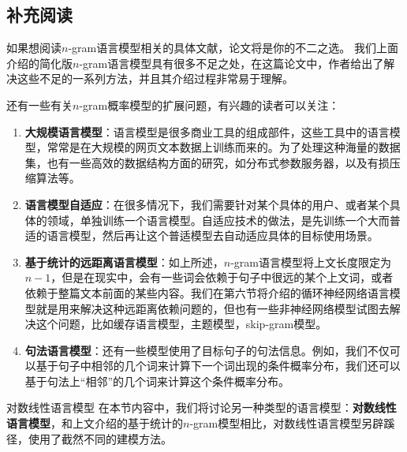 \documentclass[10pt,a4paper]{ctexart}
\makeatletter
\renewcommand{\section}{\@startsection{section}{1}{0mm}
  {-\baselineskip}{0.5\baselineskip}{\bf\leftline}}
\makeatother
\begin{document}
\subsection{补充阅读}
如果想阅读$n$-gram语言模型相关的具体文献，论文\cite{goodman2001bit}将是你的不二之选。
我们上面介绍的简化版$n$-gram语言模型具有很多不足之处，在这篇论文中，作者给出了解决这些不足的一系列方法，并且其介绍过程非常易于理解。

还有一些有关$n$-gram概率模型的扩展问题，有兴趣的读者可以关注：
\begin{enumerate}
\item[] \textbf{大规模语言模型}：语言模型是很多商业工具的组成部件，这些工具中的语言模型，常常是在大规模的网页文本数据上训练而来的。为了处理这种海量的数据集，也有一些高效的数据结构方面的研究\cite{heafield2011kenlm,pauls2011faster}，如分布式参数服务器\cite{brants2007large}，以及有损压缩算法\cite{talbot2008randomized}等。
\item[] \textbf{语言模型自适应}：在很多情况下，我们需要针对某个具体的用户、或者某个具体的领域，单独训练一个语言模型。自适应技术的做法，是先训练一个大而普适的语言模型，然后再让这个普适模型去自动适应具体的目标使用场景\cite{bellegarda2004statistical}。
\item[] \textbf{基于统计的远距离语言模型}：如上所述，$n$-gram语言模型将上文长度限定为$n-1$，但是在现实中，会有一些词会依赖于句子中很远的某个上文词，或者依赖于整篇文本前面的某些内容。我们在第六节将介绍的循环神经网络语言模型就是用来解决这种远距离依赖问题的，但也有一些非神经网络模型试图去解决这个问题，比如缓存语言模型\cite{kuhn1990cache}，主题模型\cite{blei2003latent}，skip-gram模型\cite{goodman2001bit}。
\item[] \textbf{句法语言模型}：还有一些模型使用了目标句子的句法信息。例如，我们不仅可以基于句子中相邻的几个词来计算下一个词出现的条件概率分布，我们还可以基于句法上“相邻”的几个词来计算这个条件概率分布\cite{shen2008new}。
\end{enumerate}


\newpage

\section{对数线性语言模型}
在本节内容中，我们将讨论另一种类型的语言模型：\textbf{对数线性语言模型}\cite{rosenfeld1996maximum,chen2000survey}，和上文介绍的基于统计的$n$-gram模型相比，对数线性语言模型另辟蹊径，使用了截然不同的建模方法。
\end{document}

